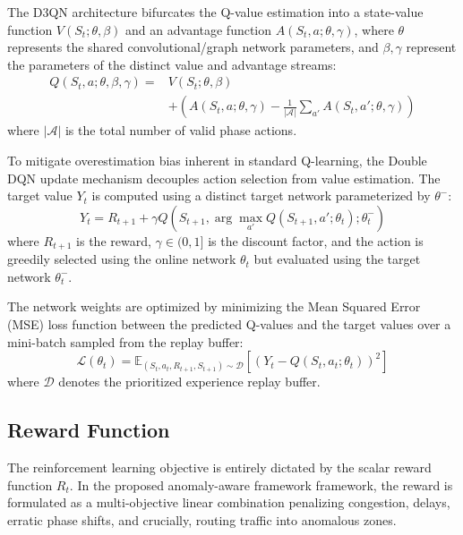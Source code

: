 \documentclass[conference]{IEEEtran}
\begin{document}
The D3QN architecture bifurcates the Q-value estimation into a state-value function $V(S_t; \theta, \beta)$ and an advantage function $A(S_t, a; \theta, \gamma)$, where $\theta$ represents the shared convolutional/graph network parameters, and $\beta, \gamma$ represent the parameters of the distinct value and advantage streams:
\begin{equation}
\begin{aligned}
Q(S_t, a; \theta, \beta, \gamma) = {} & V(S_t; \theta, \beta) \\
& + \left( A(S_t, a; \theta, \gamma) - \frac{1}{|\mathcal{A}|} \sum_{a'} A(S_t, a'; \theta, \gamma) \right)
\end{aligned}
\label{eq:dueling_q}
\end{equation}
where $|\mathcal{A}|$ is the total number of valid phase actions.

To mitigate overestimation bias inherent in standard Q-learning, the Double DQN update mechanism decouples action selection from value estimation. The target value $Y_t$ is computed using a distinct target network parameterized by $\theta^-$:
\begin{equation}
Y_t = R_{t+1} + \gamma Q\left( S_{t+1}, \arg\max_{a'} Q(S_{t+1}, a'; \theta_t); \theta_t^- \right)
\label{eq:bellman_target}
\end{equation}
where $R_{t+1}$ is the reward, $\gamma \in (0,1]$ is the discount factor, and the action is greedily selected using the online network $\theta_t$ but evaluated using the target network $\theta_t^-$.

The network weights are optimized by minimizing the Mean Squared Error (MSE) loss function between the predicted Q-values and the target values over a mini-batch sampled from the replay buffer:
\begin{equation}
\mathcal{L}(\theta_t) = \mathbb{E}_{(S_t, a_t, R_{t+1}, S_{t+1}) \sim \mathcal{D}} \left[ \left( Y_t - Q(S_t, a_t; \theta_t) \right)^2 \right]
\label{eq:dqn_loss}
\end{equation}
where $\mathcal{D}$ denotes the prioritized experience replay buffer.

\subsection{Reward Function}
\label{subsec:reward_function}

The reinforcement learning objective is entirely dictated by the scalar reward function $R_t$. In the proposed anomaly-aware framework framework, the reward is formulated as a multi-objective linear combination penalizing congestion, delays, erratic phase shifts, and crucially, routing traffic into anomalous zones. 
\end{document}
